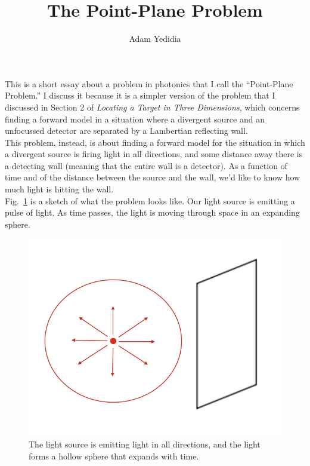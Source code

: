 \documentclass[11pt]{article}
\title{The Point-Plane Problem}
\author{Adam Yedidia}
\begin{document}
\maketitle
    
This is a short essay about a problem in photonics that I call the ``Point-Plane Problem.'' I discuss it because it is a simpler version of the problem that I discussed in Section 2 of \emph{Locating a Target in Three Dimensions}, which concerns finding a forward model in a situation where a divergent source and an unfocussed detector are separated by a Lambertian reflecting wall. \\

This problem, instead, is about finding a forward model for the situation in which a divergent source is firing light in all directions, and some distance away there is a detecting wall (meaning that the entire wall is a detector). As a function of time and of the distance between the source and the wall, we'd like to know how much light is hitting the wall. \\

Fig.~\ref{fig:expandingsphere} is a sketch of what the problem looks like. Our light source is emitting a pulse of light. As time passes, the light is moving through space in an expanding sphere. \\

\begin{figure}
\begin{center}
\includegraphics[scale=0.6]{figs/wallcircle.png} %
\caption{The light source is emitting light in all directions, and the light forms a hollow sphere that expands with time. \label{fig:expandingsphere}}
\end{center}
\end{figure}
\end{document}
